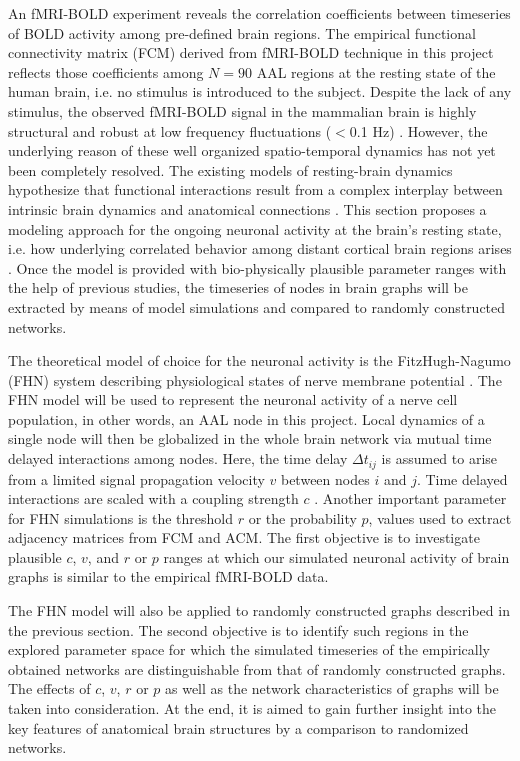 An fMRI-BOLD experiment reveals the correlation coefficients between timeseries of BOLD activity among pre-defined brain regions. The empirical functional connectivity matrix (FCM) derived from fMRI-BOLD technique in this project reflects those coefficients among $N=90$ AAL regions at the resting state of the human brain, i.e. no stimulus is introduced to the subject. Despite the lack of any stimulus, the observed fMRI-BOLD signal in the mammalian brain is highly structural and robust at low frequency fluctuations ($<$0.1 Hz) \citep{BIS95, DAM06, VIN07a}. However, the underlying reason of these well organized spatio-temporal dynamics has not yet been completely resolved. The existing models of resting-brain dynamics hypothesize that functional interactions result from a complex interplay between intrinsic brain dynamics and anatomical connections \citep{RUB09}. This section proposes a modeling approach for the ongoing neuronal activity at the brain's resting state, i.e. how  underlying correlated behavior among distant cortical brain regions arises \citep{VUK13}. Once the model is provided with bio-physically plausible parameter ranges with the help of previous studies, the timeseries of nodes in brain graphs will be extracted by means of model simulations and compared to randomly constructed networks. 

The theoretical model of choice for the neuronal activity is the FitzHugh-Nagumo (FHN) system describing physiological states of nerve membrane potential \citep{FIT61, NAG62}. The FHN model will be used to represent the neuronal activity of a nerve cell population, in other words, an AAL node in this project. Local dynamics of a single node will then be globalized in the whole brain network via mutual time delayed interactions among nodes. Here, the time delay $\Delta t_{ij}$ is assumed to arise from a limited signal propagation velocity $v$ between nodes $i$ and $j$. Time delayed interactions are scaled with a coupling strength $c$ \citep{GHO08, GHO08a, DEC09}. Another important parameter for FHN simulations is the threshold $r$ or the probability $p$, values used to extract adjacency matrices from FCM and ACM. The first objective is to investigate plausible $c$, $v$, and $r$ or $p$ ranges at which our simulated neuronal activity of brain graphs is similar to the empirical fMRI-BOLD data. 

The FHN model will also be applied to randomly constructed graphs described in the previous section. The second objective is to identify such regions in the explored parameter space for which the simulated timeseries of the empirically obtained networks are distinguishable from that of randomly constructed graphs. The effects of $c$, $v$, $r$ or $p$ as well as the network characteristics of graphs will be taken into consideration. At the end, it is aimed to gain further insight into the key features of anatomical brain structures by a comparison to randomized networks.  
 
